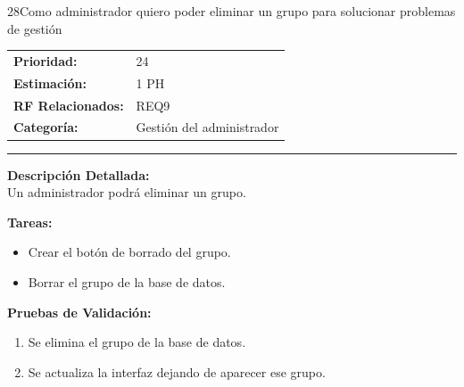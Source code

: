 \begin{hu_card}{28}{Como administrador quiero poder eliminar un grupo para solucionar problemas de gestión}
    \begin{tabularx}{\linewidth}{l X}
        \textbf{Prioridad:}   & 24\\
        \textbf{Estimación:}  & 1 PH \\
        \textbf{RF Relacionados:} & REQ9 \\
        \textbf{Categoría:} & Gestión del administrador \\
    \end{tabularx}

    \vspace{2mm}
    \hrule
    \vspace{2mm}

    \textbf{Descripción Detallada:} \\
    Un administrador podrá eliminar un grupo.

    \vspace{2mm}
    \textbf{Tareas:}
    \begin{itemize}[noitemsep, topsep=0pt]
        \item Crear el botón de borrado del grupo.
        \item Borrar el grupo de la base de datos.
    \end{itemize}

    \vspace{2mm}
    \textbf{Pruebas de Validación:}
    \begin{enumerate}[noitemsep, topsep=0pt]
        \item Se elimina el grupo de la base de datos.
        \item Se actualiza la interfaz dejando de aparecer ese grupo.
    \end{enumerate}
\end{hu_card}

